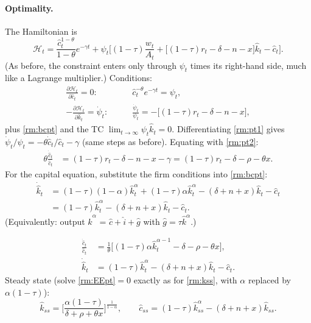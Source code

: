 \paragraph{Optimality.} The Hamiltonian is
\[
\mathcal H_t=\frac{\hat c_t^{1-\theta}}{1-\theta}e^{-\gamma t}+\psi_t\Big[(1-\tau)\frac{w_t}{A_t}+\big[(1-\tau)r_t-\delta-n-x\big]\hat k_t-\hat c_t\Big].
\]
(As before, the constraint enters only through $\psi_t$ times its right-hand side, much like a Lagrange multiplier.) Conditions:
\begin{align}
\frac{\partial\mathcal H_t}{\partial\hat c_t}=0:&\qquad \hat c_t^{-\theta}e^{-\gamma t}=\psi_t, \label{rm:pt1}\\
-\frac{\partial\mathcal H_t}{\partial\hat k_t}=\dot\psi_t:&\qquad \frac{\dot\psi_t}{\psi_t}=-\big[(1-\tau)r_t-\delta-n-x\big], \label{rm:pt2}
\end{align}
plus \eqref{rm:bcpt} and the TC $\lim_{t\to\infty}\psi_t\hat k_t=0$. Differentiating \eqref{rm:pt1} gives $\dot\psi_t/\psi_t=-\theta\dot{\hat c}_t/\hat c_t-\gamma$ (same steps as before). Equating with \eqref{rm:pt2}:
\begin{align*}
\theta\frac{\dot{\hat c}_t}{\hat c_t}&=(1-\tau)r_t-\delta-n-x-\gamma=(1-\tau)r_t-\delta-\rho-\theta x .
\end{align*}
For the capital equation, substitute the firm conditions into \eqref{rm:bcpt}:
\begin{align*}
\dot{\hat k}_t&=(1-\tau)(1-\alpha)\hat k_t^\alpha+(1-\tau)\alpha\hat k_t^{\alpha}-(\delta+n+x)\hat k_t-\hat c_t\\
&=(1-\tau)\hat k_t^\alpha-(\delta+n+x)\hat k_t-\hat c_t .
\end{align*}
(Equivalently: output $\hat k^\alpha$ = $\hat c+\hat i+\hat g$ with $\hat g=\tau\hat k^\alpha$.)

\begin{keybox}[title={Ramsey model with a proportional income tax}]
\begin{align}
\frac{\dot{\hat c}_t}{\hat c_t}&=\frac1\theta\big[(1-\tau)\alpha\hat k_t^{\alpha-1}-\delta-\rho-\theta x\big], \label{rm:EEpt}\\
\dot{\hat k}_t&=(1-\tau)\hat k_t^\alpha-(\delta+n+x)\hat k_t-\hat c_t . \label{rm:RCpt}
\end{align}
Steady state (solve \eqref{rm:EEpt}$=0$ exactly as for \eqref{rm:kss}, with $\alpha$ replaced by $\alpha(1-\tau)$):
\[
\hat k_{ss}=\Big[\frac{\alpha(1-\tau)}{\delta+\rho+\theta x}\Big]^{\frac1{1-\alpha}},\qquad
\hat c_{ss}=(1-\tau)\hat k_{ss}^\alpha-(\delta+n+x)\hat k_{ss}.
\]
\end{keybox}

